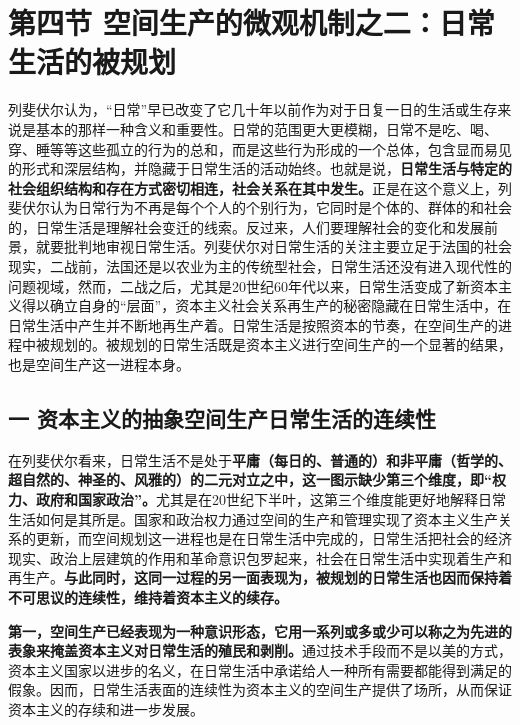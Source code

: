 \documentclass[UTF8, fontset = sourcesans, a4paper, oneside, zihao =
-4, scheme=chinese, no-math, space=true]{ctexbook}
\begin{document}
\protect\hypertarget{part0007_split_004.html}{}{}

\hypertarget{part0007_split_004.htmlux5cux23b010}{\section{第四节
空间生产的微观机制之二：日常生活的被规划}\label{part0007_split_004.htmlux5cux23b010}}

列斐伏尔认为，``日常''早已改变了它几十年以前作为对于日复一日的生活或生存来说是基本的那样一种含义和重要性。日常的范围更大更模糊，日常不是吃、喝、穿、睡等等这些孤立的行为的总和，而是这些行为形成的一个总体，包含显而易见的形式和深层结构，并隐藏于日常生活的活动始终。也就是说，\textbf{日常生活与特定的社会组织结构和存在方式密切相连，社会关系在其中发生。}正是在这个意义上，列斐伏尔认为日常行为不再是每个个人的个别行为，它同时是个体的、群体的和社会的，日常生活是理解社会变迁的线索。反过来，人们要理解社会的变化和发展前景，就要批判地审视日常生活。列斐伏尔对日常生活的关注主要立足于法国的社会现实，二战前，法国还是以农业为主的传统型社会，日常生活还没有进入现代性的问题视域，然而，二战之后，尤其是20世纪60年代以来，日常生活变成了新资本主义得以确立自身的``层面''，资本主义社会关系再生产的秘密隐藏在日常生活中，在日常生活中产生并不断地再生产着。日常生活是按照资本的节奏，在空间生产的进程中被规划的。被规划的日常生活既是资本主义进行空间生产的一个显著的结果，也是空间生产这一进程本身。

\subsection{一
资本主义的抽象空间生产日常生活的连续性}\label{part0007_split_004.htmlux5cux23c033}

在列斐伏尔看来，日常生活不是处于\textbf{平庸（每日的、普通的）和非平庸（哲学的、超自然的、神圣的、风雅的）的二元对立之中，这一图示缺少第三个维度，即``权力、政府和国家政治''。}尤其是在20世纪下半叶，这第三个维度能更好地解释日常生活如何是其所是。国家和政治权力通过空间的生产和管理实现了资本主义生产关系的更新，而空间规划这一进程也是在日常生活中完成的，日常生活把社会的经济现实、政治上层建筑的作用和革命意识包罗起来，社会在日常生活中实现着生产和再生产。\textbf{与此同时，这同一过程的另一面表现为，被规划的日常生活也因而保持着不可思议的连续性，维持着资本主义的续存。}

\textbf{第一，空间生产已经表现为一种意识形态，它用一系列或多或少可以称之为先进的表象来掩盖资本主义对日常生活的殖民和剥削。}通过技术手段而不是以美的方式，资本主义国家以进步的名义，在日常生活中承诺给人一种所有需要都能得到满足的假象。因而，日常生活表面的连续性为资本主义的空间生产提供了场所，从而保证资本主义的存续和进一步发展。
\end{document}
